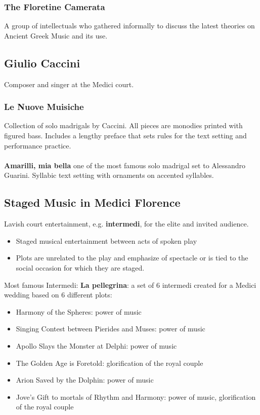 \documentclass{article}
\begin{document}
  \subsubsection{The Floretine Camerata}
  A group of intellectuals who gathered informally to discuss the latest theories on Ancient Greek Music and its use.
  \subsection{Giulio Caccini}
  Composer and singer at the Medici court.
  \subsubsection{Le Nuove Muisiche}
  Collection of solo madrigals by Caccini. All pieces are monodies printed with figured bass. Includes a lengthy preface that sets rules for the text setting and performance practice. \\ \\
  \textbf{Amarilli, mia bella} one of the most famous solo madrigal set to Alessandro Guarini. Syllabic text setting with ornaments on accented syllables.
  \subsection{Staged Music in Medici Florence}
  Lavish court entertainment, e.g. \textbf{intermedi}, for the elite and invited audience.
  \begin{itemize}
    \item Staged musical entertainment between acts of spoken play
    \item Plots are unrelated to the play and emphasize of spectacle or is tied to the social occasion for which they are staged.
  \end{itemize}
  Most famous Intermedi: \textbf{La pellegrina}: a set of 6 intermedi created for a Medici wedding based on 6 different plots:
  \begin{itemize}
    \item Harmony of the Spheres: power of music
    \item Singing Contest between Pierides and Muses: power of music
    \item Apollo Slays the Monster at Delphi: power of music
    \item The Golden Age is Foretold: glorification of the royal couple
    \item Arion Saved by the Dolphin: power of music
    \item Jove's Gift to mortals of Rhythm and Harmony: power of music, glorification of the royal couple
  \end{itemize}
\end{document}

